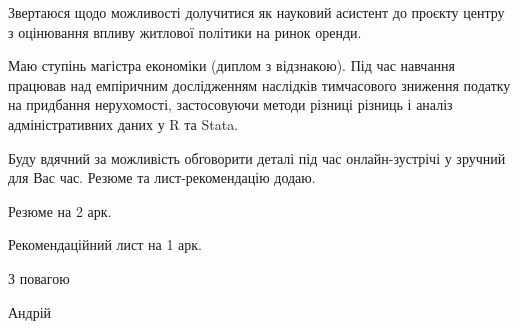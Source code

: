 \documentclass[12pt]{dstu4163}
\begin{document}


Звертаюся щодо можливості долучитися як науковий асистент до проєкту
центру з оцінювання впливу житлової політики на ринок оренди.

Маю ступінь магістра економіки (диплом з відзнакою). Під час навчання
працював над емпіричним дослідженням наслідків тимчасового зниження
податку на придбання нерухомості, застосовуючи методи різниці різниць
і аналіз адміністративних даних у R та Stata.

Буду вдячний за можливість обговорити деталі під час онлайн-зустрічі
у зручний для Вас час. Резюме та лист-рекомендацію додаю.

\begin{attachments}
  \item Резюме на 2 арк.
  \item Рекомендаційний лист на 1 арк.
\end{attachments}

\closing{З повагою}
\signature{}{Андрій }
\end{document}
